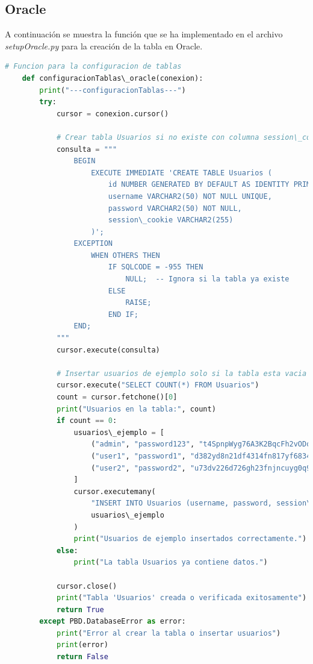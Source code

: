 \documentclass[a4paper,12pt]{article}
\begin{document}
\subsection{Oracle}
A continuación se muestra la función que se ha implementado en el archivo \textit{setupOracle.py} para la creación de la tabla en Oracle.
\begin{lstlisting}[language=Python]
    # Funcion para la configuracion de tablas
    def configuracionTablas\_oracle(conexion):
        print("---configuracionTablas---")
        try:
            cursor = conexion.cursor()
    
            # Crear tabla Usuarios si no existe con columna session\_cookie
            consulta = """
                BEGIN
                    EXECUTE IMMEDIATE 'CREATE TABLE Usuarios (
                        id NUMBER GENERATED BY DEFAULT AS IDENTITY PRIMARY KEY,
                        username VARCHAR2(50) NOT NULL UNIQUE,
                        password VARCHAR2(50) NOT NULL,
                        session\_cookie VARCHAR2(255)
                    )';
                EXCEPTION
                    WHEN OTHERS THEN
                        IF SQLCODE = -955 THEN
                            NULL;  -- Ignora si la tabla ya existe
                        ELSE
                            RAISE;
                        END IF;
                END;
            """
            cursor.execute(consulta)
    
            # Insertar usuarios de ejemplo solo si la tabla esta vacia
            cursor.execute("SELECT COUNT(*) FROM Usuarios")
            count = cursor.fetchone()[0]
            print("Usuarios en la tabla:", count)
            if count == 0:
                usuarios\_ejemplo = [
                    ("admin", "password123", "t4SpnpWyg76A3K2BqcFh2vODq0fqJGvs38ydh9"),
                    ("user1", "password1", "d382yd8n21df4314fn817yf6834188ls023d8d"),
                    ("user2", "password2", "u73dv226d726gh23fnjncuyg0q9udfjf47eueu")
                ]
                cursor.executemany(
                    "INSERT INTO Usuarios (username, password, session\_cookie) VALUES (:username, :password, :session\_cookie)",
                    usuarios\_ejemplo
                )
                print("Usuarios de ejemplo insertados correctamente.")
            else:
                print("La tabla Usuarios ya contiene datos.")
    
            cursor.close()
            print("Tabla 'Usuarios' creada o verificada exitosamente")
            return True
        except PBD.DatabaseError as error:
            print("Error al crear la tabla o insertar usuarios")
            print(error)
            return False
\end{lstlisting}
\end{document}
